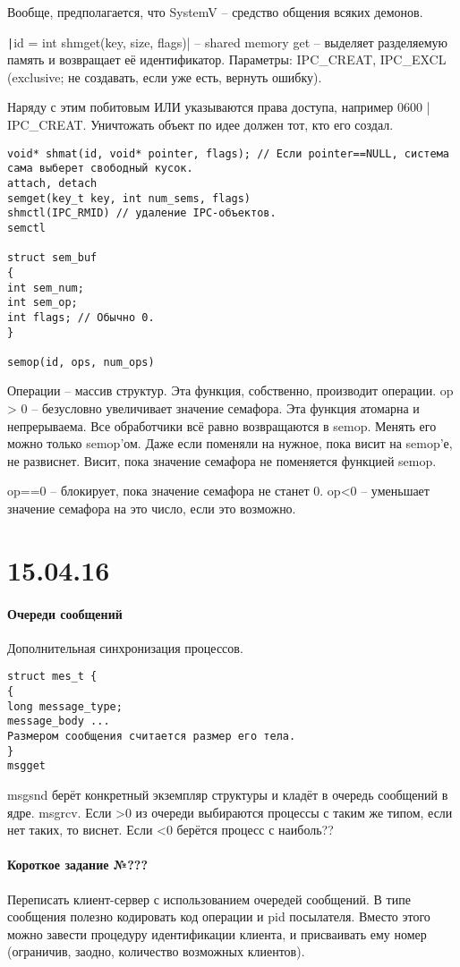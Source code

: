 \documentclass[a4paper,10pt]{article}
\newcommand{\ci}{\texttt}
\begin{document}
Вообще, предполагается, что SystemV -- средство общения всяких демонов.


\ci|id = int shmget(key, size, flags)| -- shared memory get -- выделяет разделяемую память и возвращает её идентификатор.
Параметры: IPC\_CREAT,
IPC\_EXCL (exclusive; не создавать, если уже есть, вернуть ошибку).

Наряду с этим побитовым ИЛИ указываются права доступа, например 0600 | IPC\_CREAT. Уничтожать объект по идее должен тот, кто его создал.

\begin{verbatim}
void* shmat(id, void* pointer, flags); // Если pointer==NULL, система сама выберет свободный кусок. 
attach, detach
semget(key_t key, int num_sems, flags)
shmctl(IPC_RMID) // удаление IPC-объектов.
semctl

struct sem_buf
{
int sem_num;
int sem_op;
int flags; // Обычно 0.
}

semop(id, ops, num_ops)
\end{verbatim}
Операции -- массив структур. Эта функция, собственно, производит операции. 
op > 0 -- безусловно увеличивает значение семафора. Эта функция атомарна и непрерываема. Все обработчики всё равно возвращаются в semop. Менять его можно только semop'ом. Даже если поменяли на нужное, пока висит на semop'е, не развиснет. Висит, пока значение семафора не поменяется функцией semop.

op==0 -- блокирует, пока значение семафора не станет 0. 
op<0 -- уменьшает значение семафора на это число, если это возможно.

\section{15.04.16}
\paragraph{Очереди сообщений}
Дополнительная синхронизация процессов.
\begin{verbatim}
struct mes_t {
{
long message_type;
message_body ...
Размером сообщения считается размер его тела.
}
msgget
\end{verbatim}
msgsnd берёт конкретный экземпляр структуры и кладёт в очередь сообщений в ядре.
msgrcv.
Если >0 из очереди выбираются процессы с таким же типом, если нет таких, то виснет.
Если <0 берётся процесс с наиболь??
\paragraph{Короткое задание №???}
Переписать клиент-сервер с использованием очередей сообщений.
В типе сообщения полезно кодировать код операции и pid посылателя.
Вместо этого можно завести процедуру идентификации клиента, и присваивать ему номер (ограничив, заодно, количество возможных клиентов).
\end{document}
